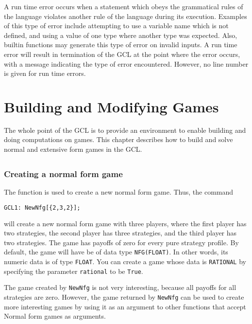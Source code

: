 A run time error occurs when a statement which obeys the grammatical
rules of the language violates another rule of the language during its
execution.  Examples of this type of error include attempting to use a
variable name which is not defined, and using a value of one type
where another type was expected.  Also, builtin functions may generate
this type of error on invalid inputs.  A run time error will result in
termination of the GCL at the point where the error occurs, with a
message indicating the type of error encountered.  However, no line
number is given for run time errors.  

\chapter{Building and Modifying Games}

The whole point of the GCL is to provide an environment to enable
building and doing computations on games.  This chapter describes how
to build and solve normal and extensive form games in the GCL.  

\section{}

\subsection{Creating a normal form game}

The function  is used to create a new normal form game.
Thus, the command

\begin{verbatim}
GCL1: NewNfg[{2,3,2}];
\end{verbatim}

\noindent 
will create a new normal form game with three players, where the first
player has two strategies, the second player has three strategies, and
the third player has two strategies.  The game has payoffs of zero for
every pure strategy profile.  By default, the game will have be of
data type \verb+NFG(FLOAT)+.  In other words, its numeric data is of
type \verb+FLOAT+.  You can create a game whose data is
\verb+RATIONAL+ by specifying the parameter \verb+rational+ to be
\verb+True+.

The game created by \verb+NewNfg+ is not very interesting, because all
payoffs for all strategies are zero.  However, the game returned by
\verb+NewNfg+ can be used to create more interesting games by using it
as an argument to other functions that accept Normal form games as
arguments.

